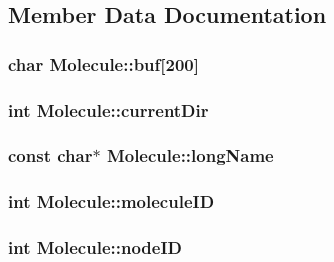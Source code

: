 \subsection{Member Data Documentation}
\hypertarget{classMolecule_a5b6f24dea7138830541e938e2eed707a}{
\subsubsection[{buf}]{\setlength{\rightskip}{0pt plus 5cm}char {\bf Molecule::buf}\mbox{[}200\mbox{]}}}
\label{classMolecule_a5b6f24dea7138830541e938e2eed707a}
\hypertarget{classMolecule_a4cd5591c0a8c07ceec922c4f2e8f295c}{
\subsubsection[{currentDir}]{\setlength{\rightskip}{0pt plus 5cm}int {\bf Molecule::currentDir}}}
\label{classMolecule_a4cd5591c0a8c07ceec922c4f2e8f295c}
\hypertarget{classMolecule_a4ac09eefeba07dcb455014acc1ad00c9}{
\subsubsection[{longName}]{\setlength{\rightskip}{0pt plus 5cm}const char$\ast$ {\bf Molecule::longName}}}
\label{classMolecule_a4ac09eefeba07dcb455014acc1ad00c9}
\hypertarget{classMolecule_a563a9a295191833b51660f77749e3628}{
\subsubsection[{moleculeID}]{\setlength{\rightskip}{0pt plus 5cm}int {\bf Molecule::moleculeID}}}
\label{classMolecule_a563a9a295191833b51660f77749e3628}
\hypertarget{classMolecule_a4eafa2831869e116f64c86987f1cac81}{
\subsubsection[{nodeID}]{\setlength{\rightskip}{0pt plus 5cm}int {\bf Molecule::nodeID}}}
